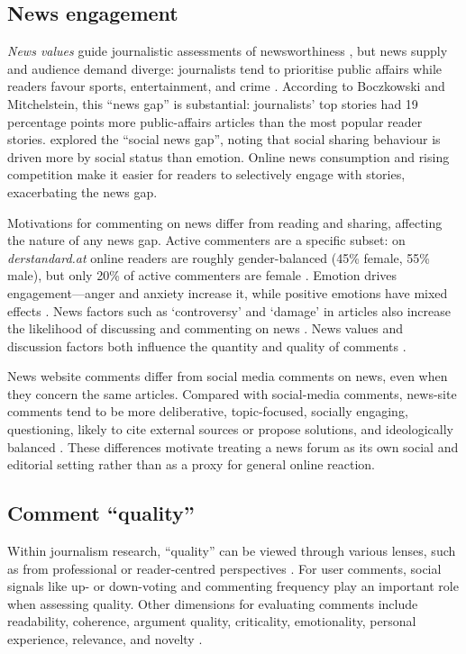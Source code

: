 \subsection{News engagement}
\emph{News values} guide journalistic assessments of newsworthiness \citep{Harcup2017}, but news supply and audience demand diverge: journalists tend to prioritise public affairs while readers favour sports, entertainment, and crime \citep{Boczkowski2013}. According to Boczkowski and Mitchelstein, this ``news gap'' is substantial: journalists’ top stories had 19 percentage points more public-affairs articles than the most popular reader stories. \citet{Bright2016} explored the ``social news gap'', noting that social sharing behaviour is driven more by social status than emotion. Online news consumption and rising competition make it easier for readers to selectively engage with stories, exacerbating the news gap.

Motivations for commenting on news differ from reading and sharing, affecting the nature of any news gap. Active commenters are a specific subset: on \emph{derstandard.at} online readers are roughly gender-balanced (45\% female, 55\% male), but only 20\% of active commenters are female \citep{KrennPetrak2021}. Emotion drives engagement---anger and anxiety increase it, while positive emotions have mixed effects \citep{Diakopoulos2011, Naab2022, Ziegele2018, MarcusNeumanMacKuen2000, Berger2012}. News factors such as `controversy' and `damage' in articles also increase the likelihood of discussing and commenting on news \citep{Weber2014}. News values and discussion factors both influence the quantity and quality of comments \citep{Ziegele2018}.

News website comments differ from social media comments on news, even when they concern the same articles. Compared with social-media comments, news-site comments tend to be more deliberative, topic-focused, socially engaging, questioning, likely to cite external sources or propose solutions, and ideologically balanced \citep{Rowe2015,He2019}. These differences motivate treating a news forum as its own social and editorial setting rather than as a proxy for general online reaction. 

\subsection{Comment ``quality''}
Within journalism research, ``quality'' can be viewed through various lenses, such as from professional \citep{Diakopoulos2015} or reader-centred perspectives \citep{MeijerBijleveld2020}. For user comments, social signals like up- or down-voting \citep{Cheng2014} and commenting frequency \citep{Diakopoulos2011} play an important role when assessing quality. Other dimensions for evaluating comments include readability, coherence, argument quality, criticality, emotionality, personal experience, relevance, and novelty \citep{Diakopoulos2015, Wang2021}.

